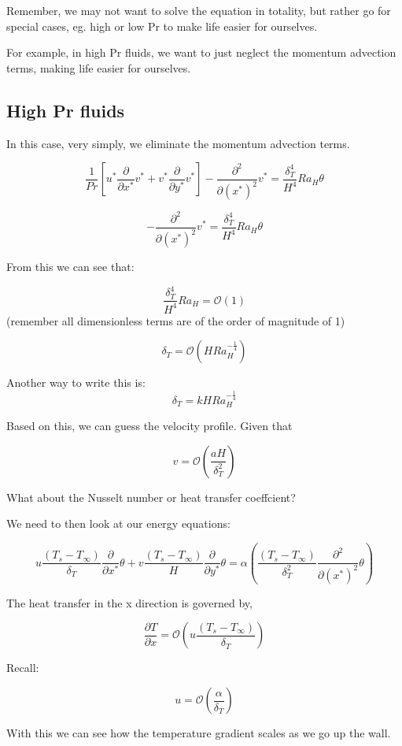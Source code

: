 \documentclass[11pt]{article}
\begin{document}
Remember, we may not want to solve the equation in totality, but rather go for special cases, eg. high or low Pr to make life easier for ourselves.

For example, in high Pr fluids, we want to just neglect the momentum advection terms, making life easier for ourselves. 

\subsection{High Pr fluids}

In this case, very simply, we eliminate the momentum advection terms.

$$ \frac{1}{Pr} \left[ u^* \frac{\partial}{\partial x^*} v^* +    v^* \frac{\partial}{\partial y^*} v^* \right] -   \frac{\partial^2}{\partial (x^*)^2} v^*  = \frac{\delta_T^4}{ H^4} Ra_H \theta $$

$$  -   \frac{\partial^2}{\partial (x^*)^2} v^*  = \frac{\delta_T^4}{ H^4} Ra_H \theta $$

From this we can see that:

$$ \frac{\delta_T^4}{ H^4} Ra_H =\mathcal{O}(1)$$
(remember all dimensionless terms are of the order of magnitude of 1)

$$\delta_T = \mathcal{O} (H Ra_H^{-\frac{1}{4}})$$

Another way to write this is:
$$\delta_T = k H Ra_H^{-\frac{1}{4}}$$

Based on this, we can guess the velocity profile. Given that

$$v = \mathcal{O}(\frac{aH}{\delta_T^2})$$

What about the Nusselt number or heat transfer coeffcient?

We need to then look at our energy equations:

$$ u \frac{(T_s - T_\infty)}{\delta_T} \frac{\partial}{\partial x^*}\theta + v \frac{(T_s - T_\infty)}{H} \frac{\partial }{\partial y^*}  \theta  = \alpha ( \frac{(T_s - T_\infty)}{\delta_T^2} \frac{\partial^2}{\partial (x^*)^2} \theta ) $$ 


The heat transfer in the x direction is governed by,

$$\frac{\partial T}{\partial x} = \mathcal{O}( u \frac{(T_s - T_\infty)}{\delta_T})$$

Recall:

$$u  = \mathcal{O}(\frac{\alpha}{\delta_T})$$

With this we can see how the temperature gradient scales as we go up the wall. 
\end{document}
